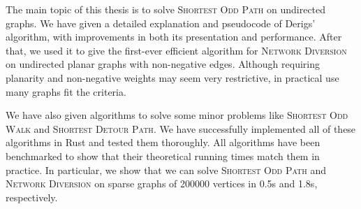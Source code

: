 The main topic of this thesis is to solve \textsc{Shortest Odd Path} on undirected graphs. We have given a detailed explanation and pseudocode of Derigs' \cite{source:derigs_shortest_odd_path} algorithm, with improvements in both its presentation and performance. After that, we used it to give the first-ever efficient algorithm for \textsc{Network Diversion} on undirected planar graphs with non-negative edges. Although requiring planarity and non-negative weights may seem very restrictive, in practical use many graphs fit the criteria.

We have also given algorithms to solve some minor problems like \textsc{Shortest Odd Walk} and \textsc{Shortest Detour Path}. We have successfully implemented all of these algorithms in Rust and tested them thoroughly. All algorithms have been benchmarked to show that their theoretical running times match them in practice. In particular, we show that we can solve \textsc{Shortest Odd Path} and \textsc{Network Diversion} on sparse graphs of 200000 vertices in 0.5s and 1.8s, respectively.
